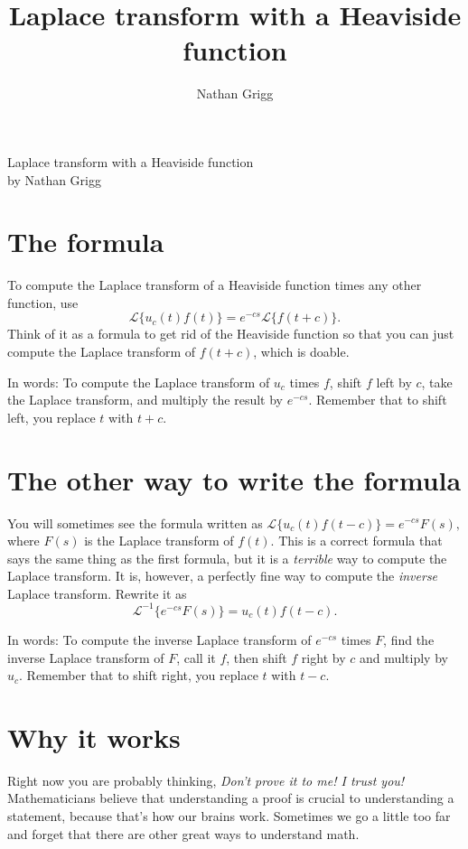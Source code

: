 \documentclass[11pt,letterpaper,oneside]{scrartcl}
\title{Laplace transform with a Heaviside function}
\author{Nathan Grigg}
\date{}
\renewcommand{\L}[1]{\mathcal L\{#1\}}
\newcommand{\Lb}[1]{\mathcal L\Big\{#1\Big\}}
\newcommand{\Lbi}[1]{\mathcal L^{-1}\Big\{#1\Big\}}
\begin{document}
\begin{center}
	{\LARGE Laplace transform with a Heaviside function}\\[10pt]
	by Nathan Grigg
\end{center}


\section{The formula}
To compute the Laplace transform of a Heaviside function
times any other function, use
\begin{equation*}
\boxed{\Lb{u_c(t) f(t)} = e^{-cs}\Lb{f(t+c)}.}
\end{equation*}
Think of it as a formula to get rid of the Heaviside function so that you
can just compute the Laplace transform of $f(t+c)$, which is doable.

In words: To compute the Laplace transform of
$u_c$ times $f$, shift $f$ left by $c$,
take the Laplace transform, and multiply the result by $e^{-cs}$.
Remember that to shift left, you replace $t$ with $t+c$.

\section{The other way to write the formula}

You will sometimes see the formula written as
$\L{u_c(t) f(t-c)} = e^{-cs}F(s),$
where $F(s)$ is the Laplace transform of $f(t)$.
This is a correct formula that says the same thing as the first
formula, but it is a \emph{terrible} way to compute the Laplace
transform. It is, however, a perfectly fine way to compute
the \emph{inverse} Laplace transform.
Rewrite it as
\begin{equation*}
	\boxed{\Lbi{e^{-cs} F(s)} = u_c(t)f(t-c).}
\end{equation*}

In words: To compute the inverse Laplace transform of $e^{-cs}$ times $F$,
find the inverse Laplace transform of $F$, call it $f$, then shift $f$ right
by $c$ and multiply by $u_c$.
Remember that to shift right, you replace $t$ with $t-c$.



\section{Why it works}

Right now you are probably thinking, \emph{Don't prove it to me! I trust you!}
Mathematicians believe that understanding a proof is crucial to understanding
a statement, because that's how our brains work. Sometimes we go a little too
far and forget that there are other great ways to understand math.
\end{document}
